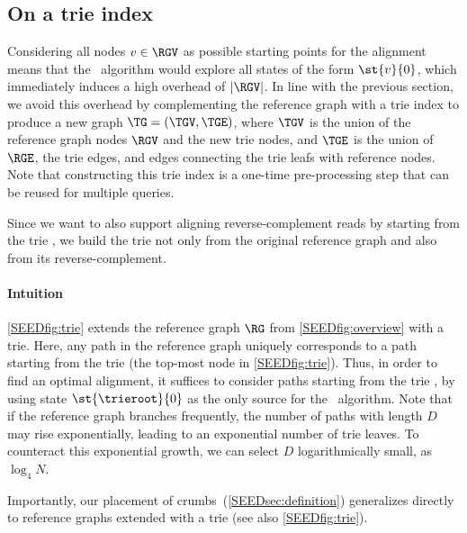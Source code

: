 

\subsection{On a trie index} \label{SEEDsec:trie}
%
Considering all nodes $v \in \RGV$ as possible starting points for the alignment
means that the \A~algorithm would explore all states of the form $\st{v}{0}$,
which immediately induces a high overhead of $\lvert \RGV \rvert$.
%
In line with the previous section, we avoid this overhead by complementing the
reference graph with a trie index to produce a new graph $\TG = (\TGV, \TGE)$,
where $\TGV$ is the union of the reference graph nodes $\RGV$ and the new trie
nodes, and $\TGE$ is the union of $\RGE$, the trie edges, and edges
connecting the trie leafs with reference nodes. Note that constructing this trie
index is a one-time pre-processing step that can be reused for multiple queries.

Since we want to also support aligning reverse-complement reads by starting from
the trie \trieroot{}, we build the trie not only from the original reference
graph and also from its reverse-complement.

\paragraph{Intuition}
%
\cref{SEEDfig:trie} extends the reference graph $\RG$ from \cref{SEEDfig:overview} with
a trie. Here, any path in the reference graph uniquely corresponds to a path
starting from the trie \trieroot{} (the top-most node in \cref{SEEDfig:trie}). Thus,
in order to find an optimal alignment, it suffices to consider paths starting
from the trie \trieroot{}, by using state $\st{\trieroot}{0}$ as the only source
for the \A~algorithm.
%
Note that if the reference graph branches frequently, the number of paths with
length $D$ may rise exponentially, leading to an exponential number of trie
leaves. To counteract this exponential growth, we can select $D$ logarithmically
small, as $\log_4N$.

Importantly, our placement of crumbs~(\cref{SEEDsec:definition}) generalizes
directly to reference graphs extended with a trie (see also
\cref{SEEDfig:trie}).


